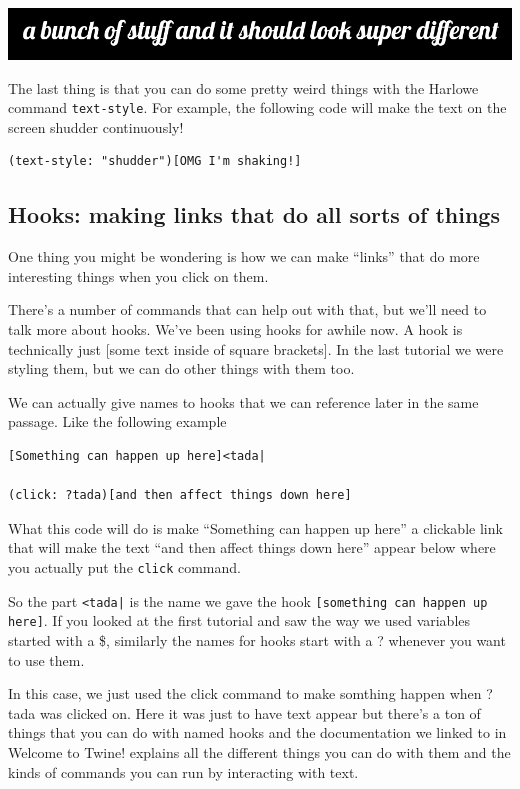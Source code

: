 \documentclass[a5paper,11pt]{article}
\begin{document}
\includegraphics[width=0.9\linewidth]{LobsterScreenshot}

The last thing is that you can do some pretty weird things with the Harlowe command \verb"text-style". For example, the following code will make the text on the screen shudder continuously!
\begin{verbatim}
(text-style: "shudder")[OMG I'm shaking!]
\end{verbatim}
\subsection{Hooks: making links that do all sorts of things}
One thing you might be wondering is how we can make ``links'' that do more interesting things when you click on them.

There's a number of commands that can help out with that, but we'll need to talk more about hooks. We've been using hooks for awhile now. A hook is technically just [some text inside of square brackets]. In the last tutorial we were styling them, but we can do other things with them too.

We can actually give names to hooks that we can reference later in the same passage. Like the following example
\begin{verbatim}
[Something can happen up here]<tada|

(click: ?tada)[and then affect things down here]
\end{verbatim}
What this code will do is make ``Something can happen up here'' a clickable link that will make the text ``and then affect things down here'' appear below where you actually put the \verb|click| command.

So the part \verb"<tada|" is the name we gave the hook
\texttt{[something can happen up here]}. If you looked at the first tutorial and saw the way we used variables started with a \$, similarly the names for hooks start with a ? whenever you want to use them.

In this case, we just used the click command to make somthing happen when ?tada was clicked on. Here it was just to have text appear but there's a ton of things that you can do with named hooks and the documentation we linked to in Welcome to Twine! explains all the different things you can do with them and the kinds of commands you can run by interacting with text.
\end{document}
